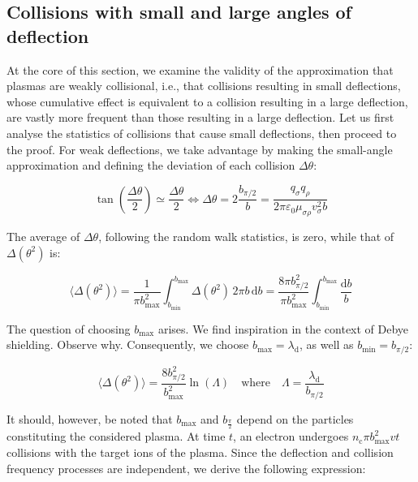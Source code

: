 \subsection{Collisions with small and large angles of deflection}

At the core of this section, we examine the validity of the approximation that plasmas are weakly collisional, i.e., that collisions resulting in small deflections, whose cumulative effect is equivalent to a collision resulting in a large deflection, are vastly more frequent than those resulting in a large deflection. Let us first analyse the statistics of collisions that cause small deflections, then proceed to the proof. For weak deflections, we take advantage by making the small-angle approximation and defining the deviation of each collision $\Delta\theta$:

\begin{equation}
    \tan\left(\frac{\Delta\theta}{2}\right)\simeq\frac{\Delta\theta}{2}\Longleftrightarrow\Delta\theta=2\frac{b_{\pi/2}}{b}=\frac{q_\sigma q_\rho}{2\pi\varepsilon_0\mu_{\sigma\rho}v_\sigma^2b}
\end{equation}

The average of $\Delta\theta$, following the random walk statistics, is zero, while that of $\Delta(\theta^2)$ is:

\begin{equation}
    \langle\Delta(\theta^2)\rangle=\frac{1}{\pi b_\text{max}^2}\int_{b_\text{min}}^{b_\text{max}}\Delta(\theta^2)\,2\pi b\,\mathrm{d}b=\frac{8\pi b_{\pi/2}^2}{\pi b_\text{max}^2}\int_{b_\text{min}}^{b_\text{max}}\frac{\mathrm{d}b}{b}
\end{equation}

The question of choosing $b_\text{max}$ arises. We find inspiration in the context of Debye shielding. Observe why. Consequently, we choose $b_\text{max}=\lambda_\mathrm{d}$, as well as $b_\text{min}=b_{\pi/2}$:

\begin{equation}
    \langle\Delta(\theta^2)\rangle=\frac{8b_{\pi/2}^2}{b_\text{max}^2}\ln\left(\Lambda\right)\quad\text{where}\quad\Lambda=\frac{\lambda_\mathrm{d}}{b_{\pi/2}}
\end{equation}

It should, however, be noted that $b_\text{max}$ and $b_{\frac{\pi}{2}}$ depend on the particles constituting the considered plasma. At time $t$, an electron undergoes $n_\text{c}\pi b_\text{max}^2vt$ collisions with the target ions of the plasma. Since the deflection and collision frequency processes are independent, we derive the following expression:

